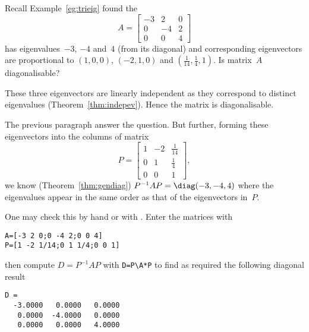 \begin{example} \label{eg:trieigp}
Recall Example~\ref{eg:trieig} found the 
\begin{equation*}
A=\begin{bmatrix}-3&2&0
\\0&-4&2
\\0&0&4\end{bmatrix}
\end{equation*}
has eigenvalues~\(-3\), \(-4\) and~\(4\) (from its diagonal) and corresponding eigenvectors are proportional to \((1,0,0)\), \((-2,1,0)\) and \((\frac1{14},\frac14,1)\).
Is matrix~\(A\) diagonalisable?
\begin{solution} 
These three eigenvectors are linearly independent as they correspond to distinct eigenvalues (Theorem~\ref{thm:indepev}).
Hence the matrix is diagonalisable.

The previous paragraph answer the question. 
But further, forming these eigenvectors into the columns of matrix
\begin{equation*}
P=\begin{bmatrix} 1&-2&\frac1{14}
\\0&1&\frac14
\\0&0&1 \end{bmatrix},
\end{equation*}
we know (Theorem~\ref{thm:gendiag}) \(P^{-1}AP=\diag(-3,-4,4)\) where the eigenvalues appear in the same order as that of the eigenvectors in~\(P\).

One may check this by hand or with \script.
Enter the matrices with
\begin{verbatim}
A=[-3 2 0;0 -4 2;0 0 4]
P=[1 -2 1/14;0 1 1/4;0 0 1]
\end{verbatim}
\setbox\ajrqrbox\hbox{}\marginpar{\usebox{\ajrqrbox}}%
then compute \(D=P^{-1}AP\) with \verb|D=P\A*P| to find as required the following diagonal result
\begin{verbatim}
D =
  -3.0000   0.0000   0.0000
   0.0000  -4.0000   0.0000
   0.0000   0.0000   4.0000
\end{verbatim}
\end{solution}
\end{example}



